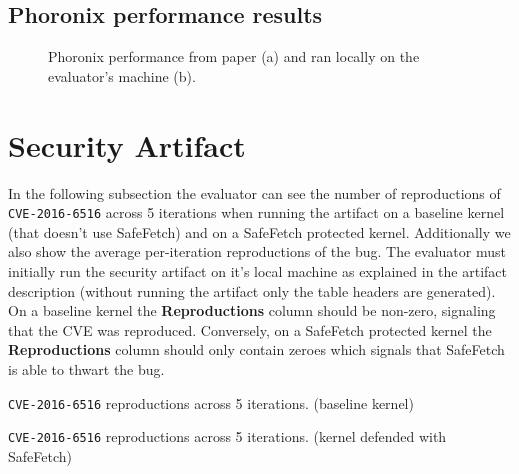 \subsection{Phoronix performance results}
\begin{figure}[!h]
  \hfill
  \hfill
  \hfill
  \centering
  \caption{Phoronix performance from paper (a) and ran locally on the evaluator's machine (b).}
  \label{fig:phoronixosbench}
  \end{figure}

\newpage
\section{Security Artifact}
In the following subsection the evaluator can see the number of reproductions of \texttt{CVE-2016-6516} 
across 5 iterations when running the artifact on a baseline kernel (that doesn't use SafeFetch) and on a 
SafeFetch protected kernel.
Additionally we also show the average per-iteration reproductions of the bug.
The evaluator must initially run the security artifact on it's local machine as 
explained in the artifact description (without running the artifact only the table headers are generated).
On a baseline kernel the \textbf{Reproductions} column should be non-zero, signaling that the CVE was 
reproduced.
Conversely, on a SafeFetch protected kernel the \textbf{Reproductions} column should only contain zeroes
which signals that SafeFetch is able to thwart the bug.

\begin{table}[!h]
  \caption{\texttt{CVE-2016-6516} reproductions across 5 iterations. (baseline kernel)}
  \begin{center}
  \resizebox{0.25\columnwidth}{!}{%
  
  }
\end{center}
\label{tab:security-baseline-local}
\end{table}
\begin{table}[!h]
  \caption{\texttt{CVE-2016-6516} reproductions across 5 iterations. (kernel defended with SafeFetch)}
  \begin{center}
  \resizebox{0.25\columnwidth}{!}{%
  
  }
\end{center}
\label{tab:security-safefetch-local}
\end{table}





